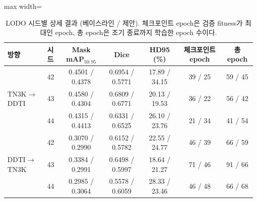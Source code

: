 \begin{table}[htbp]
\centering
\footnotesize
\caption[LODO 시드별 상세 결과 (베이스라인 / 제안).]{LODO 시드별 상세 결과 (베이스라인 / 제안). 체크포인트 epoch은 검증 fitness가 최대인 epoch, 총 epoch은 조기 종료까지 학습한 epoch 수이다.}
\label{tab:lodo_seed}
\begin{adjustbox}{max width=\linewidth}
\begin{tabular}{llccccc}
\toprule
방향 & 시드 & Mask mAP$_{50:95}$ & Dice & HD95 (\%) & 체크포인트 epoch & 총 epoch \\
\midrule
\multirow{3}{*}{TN3K$\rightarrow$DDTI} & 42 & 0.4501 / 0.4378 & 0.6954 / 0.5771 & 17.89 / 34.15 & 39 / 25 & 59 / 45 \\
 & 43 & 0.4580 / 0.4304 & 0.6809 / 0.6771 & 20.13 / 19.53 & 36 / 22 & 56 / 42 \\
 & 44 & 0.4315 / 0.4413 & 0.6331 / 0.6525 & 26.10 / 23.76 & 21 / 34 & 41 / 54 \\
\midrule
\multirow{3}{*}{DDTI$\rightarrow$TN3K} & 42 & 0.3070 / 0.2990 & 0.6152 / 0.5782 & 22.55 / 24.77 & 46 / 39 & 66 / 59 \\
 & 43 & 0.3384 / 0.2991 & 0.6498 / 0.5997 & 18.64 / 21.27 & 71 / 46 & 91 / 66 \\
 & 44 & 0.2985 / 0.3064 & 0.5578 / 0.6059 & 28.33 / 23.46 & 46 / 48 & 66 / 68 \\
\bottomrule
\end{tabular}
\end{adjustbox}
\end{table}
